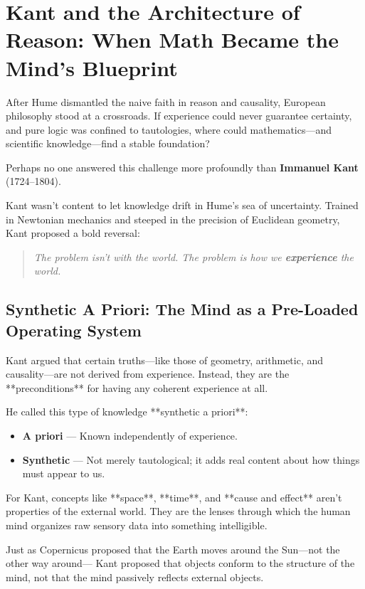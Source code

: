 \section{Kant and the Architecture of Reason: When Math Became the Mind’s Blueprint}

After Hume dismantled the naive faith in reason and causality, European philosophy stood at a crossroads. If experience could never guarantee certainty, and pure logic was confined to tautologies, where could mathematics—and scientific knowledge—find a stable foundation?

Perhaps no one answered this challenge more profoundly than \textbf{Immanuel Kant} (1724–1804).

Kant wasn’t content to let knowledge drift in Hume’s sea of uncertainty. Trained in Newtonian mechanics and steeped in the precision of Euclidean geometry, Kant proposed a bold reversal:

\begin{quote}
\textit{The problem isn’t with the world.  
The problem is how we \textbf{experience} the world.}
\end{quote}

\subsection*{Synthetic A Priori: The Mind as a Pre-Loaded Operating System}

Kant argued that certain truths—like those of geometry, arithmetic, and causality—are not derived from experience. Instead, they are the **preconditions** for having any coherent experience at all.

He called this type of knowledge **synthetic a priori**:

\begin{itemize}
    \item \textbf{A priori} — Known independently of experience.
    \item \textbf{Synthetic} — Not merely tautological; it adds real content about how things must appear to us.
\end{itemize}

For Kant, concepts like **space**, **time**, and **cause and effect** aren’t properties of the external world. They are the lenses through which the human mind organizes raw sensory data into something intelligible.

\begin{tcolorbox}[colback=gray!5!white, colframe=black!75!white, title={Kant’s Copernican Revolution}]
Just as Copernicus proposed that the Earth moves around the Sun—not the other way around—  
Kant proposed that objects conform to the structure of the mind,  
not that the mind passively reflects external objects.
\end{tcolorbox}

